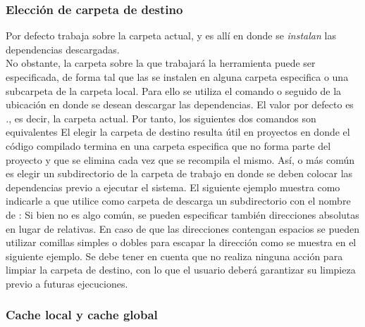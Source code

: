\subsubsection{Elección de carpeta de destino}
\label{subsubsec:guide:folder}

Por defecto \fronttier trabaja sobre la carpeta actual, y es allí en
donde se \emph{instalan} las dependencias descargadas.\\
No obstante, la carpeta sobre la que trabajará la herramienta puede ser 
especificada, de forma tal que las \dependencies se instalen en alguna carpeta
especifica o una subcarpeta de la carpeta local. Para ello se utiliza el  
comando  o  seguido de la ubicación en donde 
se desean descargar las dependencias.
El valor por defecto es \emph{.}, es decir, la carpeta actual. Por tanto, los 
siguientes dos comandos son equivalentes
El elegir la carpeta de destino resulta útil en proyectos en donde el código 
compilado termina en una carpeta especifica que no forma parte del proyecto y 
que se elimina cada vez que se recompila el mismo. Así, o más común es elegir 
un subdirectorio de la carpeta de trabajo en donde se deben colocar las 
dependencias previo a ejecutar el sistema. El siguiente ejemplo muestra como 
indicarle a \fronttier que utilice como carpeta de descarga un subdirectorio 
con el nombre de
:
Si bien no es algo común, se pueden especificar también direcciones absolutas 
en lugar de relativas. En caso de que las direcciones contengan espacios se 
pueden utilizar comillas simples o dobles para escapar la dirección como se 
muestra en el siguiente ejemplo.
Se debe tener en cuenta que \fronttier no realiza ninguna acción para limpiar 
la carpeta de destino, con lo que el usuario deberá garantizar su limpieza 
previo a futuras ejecuciones.

\subsubsection{Cache local y cache global}
\label{subsubsec:guide:localmode}

